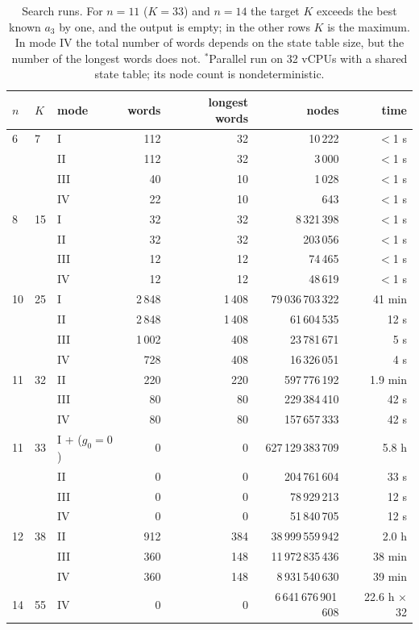 \begin{table}[tp]
\bigskip
\caption{Search runs. For $n=11$ ($K=33$) and $n=14$ the target $K$ exceeds the best known $a_3$ by one, and the output is empty; in the other rows $K$ is the maximum.
In mode IV the total number of words depends on the state table size, but the number of the longest words does not.
$^*$Parallel run on 32 vCPUs with a shared state table; its node count is nondeterministic.}
\label{tab:runs}
\bigskip
\begin{tabular}{lllrrrr}
\toprule
$n$ & $K$ & mode & words & longest words & nodes & time \\
\midrule
6 & 7 & I & 112 & 32 & 10\,222 & $<$1 s \\
 & & II & 112 & 32 & 3\,000 & $<$1 s \\
 & & III & 40 & 10 & 1\,028 & $<$1 s \\
 & & IV & 22 & 10 & 643 & $<$1 s \\
\midrule
8 & 15 & I & 32 & 32 & 8\,321\,398 & $<$1 s \\
 & & II & 32 & 32 & 203\,056 & $<$1 s \\
 & & III & 12 & 12 & 74\,465 & $<$1 s \\
 & & IV & 12 & 12 & 48\,619 & $<$1 s \\
\midrule
10 & 25 & I & 2\,848 & 1\,408 & 79\,036\,703\,322 & 41 min \\
 & & II & 2\,848 & 1\,408 & 61\,604\,535 & 12 s \\
 & & III & 1\,002 & 408 & 23\,781\,671 & 5 s \\
 & & IV & 728 & 408 & 16\,326\,051 & 4 s \\
\midrule
11 & 32 & II & 220 & 220 & 597\,776\,192 & 1.9 min \\
 & & III & 80 & 80 & 229\,384\,410 & 42 s \\
 & & IV & 80 & 80 & 157\,657\,333 & 42 s \\
\midrule
11 & 33 & I + ($g_0=0$) & 0 & 0 & 627\,129\,383\,709 & 5.8 h \\
 & & II & 0 & 0 & 204\,761\,604 & 33 s \\
 & & III & 0 & 0 & 78\,929\,213 & 12 s \\
 & & IV & 0 & 0 & 51\,840\,705 & 12 s \\
\midrule
12 & 38 & II & 912 & 384 & 38\,999\,559\,942 & 2.0 h \\
 & & III & 360 & 148 & 11\,972\,835\,436 & 38 min \\
 & & IV & 360 & 148 & 8\,931\,540\,630 & 39 min \\
\midrule
14 & 55 & IV & 0 & 0 & 6\,641\,676\,901\,608\rlap{$^*$} & 22.6 h $\times$ 32\rlap{$^*$} \\
\bottomrule
\end{tabular}
\end{table}

